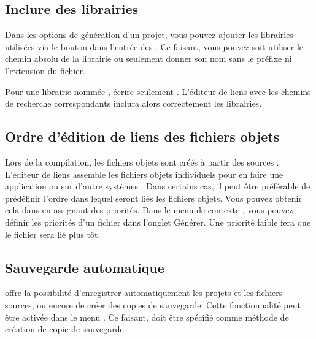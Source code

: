 \subsection{Inclure des librairies}

Dans les options de génération d'un projet, vous pouvez ajouter les librairies utilisées via le bouton  dans l'entrée  des . Ce faisant, vous pouvez soit utiliser le chemin absolu de la librairie ou seulement donner son nom sans le préfixe  ni l'extension du fichier.


Pour une librairie nommée , écrire seulement . L'éditeur de liens avec les chemins de recherche correspondants inclura alors correctement les librairies.


\subsection{Ordre d'édition de liens des fichiers objets}

Lors de la compilation, les fichiers objets  sont créés à partir des sources . L'éditeur de liens assemble les fichiers objets individuels pour en faire une application  ou sur d'autre systèmes . Dans certains cas, il peut être préférable de prédéfinir l'ordre dans lequel seront liés les fichiers objets. Vous pouvez obtenir cela dans \codeblocks en assignant des priorités. Dans le menu de contexte , vous pouvez définir les priorités d'un fichier dans l'onglet Générer. Une priorité faible fera que le fichier sera lié plus tôt.

\subsection{Sauvegarde automatique}

\codeblocks offre la possibilité d'enregistrer automatiquement les projets et les fichiers sources, ou encore de créer des copies de sauvegarde. Cette fonctionnalité peut être activée dans le menu . Ce faisant,  doit être spécifié comme méthode de création de copie de sauvegarde.

